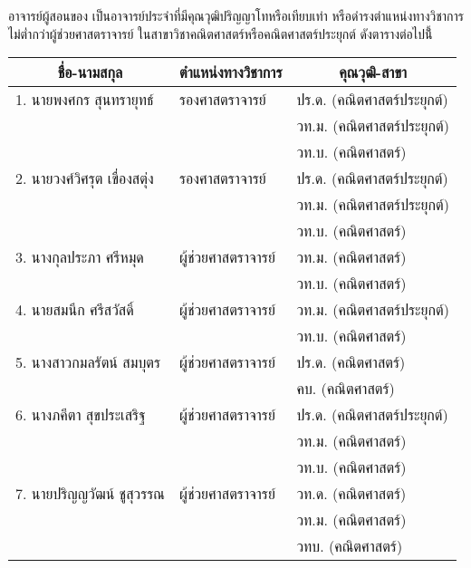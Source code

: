 {{%
	อาจารย์ผู้สอนของ\printprogram{} เป็นอาจารย์ประจำที่มีคุณวุฒิปริญญาโทหรือเทียบเท่า หรือดำรงตำแหน่งทางวิชาการไม่ต่ำกว่าผู้ช่วยศาสตราจารย์ ในสาขาวิชาคณิตศาสตร์หรือคณิตศาสตร์ประยุกต์ ดังตารางต่อไปนี้้
\begin{center}
	{\small 
		\begin{longtable}{|p{}|l|p{}|}
			\hline
			\multicolumn{1}{|c|}{\textbf{ชื่อ-นามสกุล}} & \multicolumn{1}{c}{\textbf{ตำแหน่งทางวิชาการ}} & \multicolumn{1}{|c|}{\textbf{คุณวุฒิ-สาขา}} 
			\\\hline
			\endhead
			\hline
			\endfoot
			1. นายพงศกร สุนทรายุทธ์
			&รองศาสตราจารย์	&ปร.ด. (คณิตศาสตร์ประยุกต์) \\
			&&วท.ม. (คณิตศาสตร์ประยุกต์)\\
			&& วท.บ. (คณิตศาสตร์)\\
			\hline
			
			2. นายวงศ์วิศรุต เขื่องสตุ่ง
			&รองศาสตราจารย์&ปร.ด. (คณิตศาสตร์ประยุกต์)\\
			&&วท.ม. (คณิตศาสตร์ประยุกต์)\\
			&& วท.บ. (คณิตศาสตร์)\\
			\hline
			
			3. นางกุลประภา ศรีหมุด
			&ผู้ช่วยศาสตราจารย์&วท.ม. (คณิตศาสตร์)\\
			&&วท.บ. (คณิตศาสตร์)\\	
			\hline
			
			
			4. นายสมนึก ศรีสวัสดิ์
			&ผู้ช่วยศาสตราจารย์& วท.ม. (คณิตศาสตร์ประยุกต์)\\
			&&วท.บ. (คณิตศาสตร์)\\
			\hline
			
			
			5. นางสาวกมลรัตน์ สมบุตร
			&ผู้ช่วยศาสตราจารย์&ปร.ด. (คณิตศาสตร์)\\
			&&คบ. (คณิตศาสตร์)\\
			\hline
			
			

			6. นางภคีตา สุขประเสริฐ
			&	ผู้ช่วยศาสตราจารย์ 
			& ปร.ด. (คณิตศาสตร์ประยุกต์)\\
			&& วท.ม. (คณิตศาสตร์)\\
			&& วท.บ. (คณิตศาสตร์) 	\\	\hline
			
			
			7. นายปริญญวัฒน์ ชูสุวรรณ
			&ผู้ช่วยศาสตราจารย์
			&วท.ด. (คณิตศาสตร์)\\
			&&วท.ม. (คณิตศาสตร์)\\
			&&วทบ. (คณิตศาสตร์)\\\hline
			

\end{longtable}}
\end{center}}}
